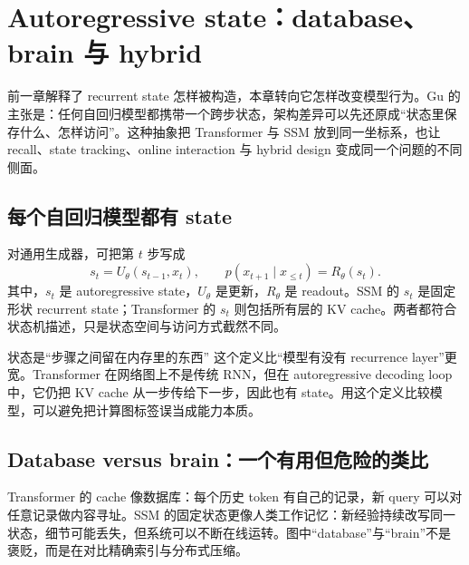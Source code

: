\section{Autoregressive state：database、brain 与 hybrid}

前一章解释了 recurrent state 怎样被构造，本章转向它怎样改变模型行为。Gu 的主张是：任何自回归模型都携带一个跨步状态，架构差异可以先还原成“状态里保存什么、怎样访问”。这种抽象把 Transformer 与 SSM 放到同一坐标系，也让 recall、state tracking、online interaction 与 hybrid design 变成同一个问题的不同侧面。

\subsection{每个自回归模型都有 state}

对通用生成器，可把第 $t$ 步写成
\[
s_t=U_\theta(s_{t-1},x_t),
\qquad
p(x_{t+1}\mid x_{\le t})=R_\theta(s_t).
\]
其中，$s_t$ 是 autoregressive state，$U_\theta$ 是更新，$R_\theta$ 是 readout。SSM 的 $s_t$ 是固定形状 recurrent state；Transformer 的 $s_t$ 则包括所有层的 KV cache。两者都符合状态机描述，只是状态空间与访问方式截然不同。


\begin{importantbox}{状态是“步骤之间留在内存里的东西”}
这个定义比“模型有没有 recurrence layer”更宽。Transformer 在网络图上不是传统 RNN，但在 autoregressive decoding loop 中，它仍把 KV cache 从一步传给下一步，因此也有 state。用这个定义比较模型，可以避免把计算图标签误当成能力本质。
\end{importantbox}

\subsection{Database versus brain：一个有用但危险的类比}

Transformer 的 cache 像数据库：每个历史 token 有自己的记录，新 query 可以对任意记录做内容寻址。SSM 的固定状态更像人类工作记忆：新经验持续改写同一状态，细节可能丢失，但系统可以不断在线运转。图中“database”与“brain”不是褒贬，而是在对比精确索引与分布式压缩。



